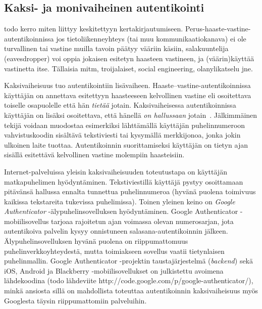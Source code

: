 \documentclass[finnish,gradu]{tktltiki}
\begin{document}

  \subsection{Kaksi- ja monivaiheinen autentikointi} %
  \label{sub:kaksivaiheinen_autentikointi}

  todo kerro miten liittyy keskitettyyn kertakirjautumiseen.
  Perus-haaste-vastine-autentikoinnissa jos tietoliikenneyhteys (tai muu kommunikaatiokanava) ei ole turvallinen tai vastine muilla tavoin päätyy vääriin käsiin, salakuuntelija (eavesdropper) voi oppia jokaisen esitetyn haasteen vastineen, ja (väärin)käyttää vastinetta itse.
  Tällaisia mitm, troijalaiset, social engineering, olanylikatselu jne.

  Kaksivaiheisuus tuo autentikointiin lisävaiheen. Haaste--vastine-autentikoinnissa käyttäjän on annettava esitettyyn haasteeseen kelvollinen vastine eli osoitettava toiselle osapuolelle että hän \emph{tietää} jotain. Kaksivaiheisessa autentikoinnissa käyttäjän on lisäksi osoitettava, että hänellä \emph{on hallussaan} jotain~\cite{NIST_SP800-63-1, google_2step_2010}. Jälkimmäinen tekijä voidaan muodostaa esimerkiksi lähttämällä käyttäjän puhelinnumeroon vahvistuskoodin sisältävä tekstiviesti tai kysymällä merkkijonoa, jonka jokin ulkoinen laite tuottaa. Autentikoinnin suorittamiseksi käyttäjän on tietyn ajan sisällä esitettävä kelvollinen vastine molempiin haasteisiin.

  Internet-palveluissa yleisin kaksivaiheisuuden toteutustapa on käyttäjän matkapuhelimen hyödyntäminen. Tekstiviestillä käyttäjä pystyy osoittamaan pitävänsä hallussa ennalta tunnettua puhelinnumeroa (hyvänä puolena toimivuus kaikissa tekstareita tukevissa puhelimissa). Toinen yleinen keino on \emph{Google Authenticator} -älypuhelinsovelluksen hyödyntäminen. Google Authenticator -mobiilisovellus tarjoaa rajoitetun ajan voimassa olevan numerosarjan, jota autentikoiva palvelin kysyy onnistuneen salasana-autentikoinnin jälkeen. Älypuhelinsovelluksen hyvänä puolena on riippumattomuus puhelinverkkoyhteydestä, mutta toimiakseen sovellus vaatii tietynlaisen puhelinmallin. Google Authenticator -projektin taustajärjestelmä (\emph{backend}) sekä iOS, Android ja Blackberry -mobiilisovellukset on julkistettu avoimena lähdekoodina (todo lähdeviite http://code.google.com/p/google-authenticator/), minkä ansiosta sillä on mahdollista toteuttaa autentikoinnin kaksivaiheisuus myös Googlesta täysin riippumattomiin palveluihin.
\end{document}
